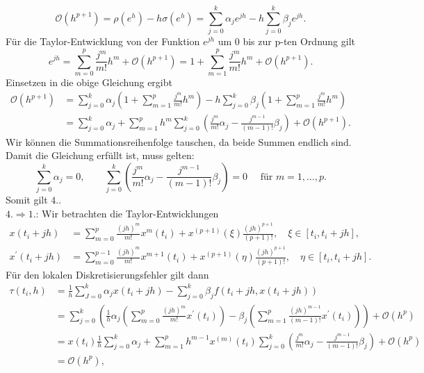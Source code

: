 \[
    \mathcal{O}(h^{p+1}) = \rho(e^h) - h \sigma(e^h) = \sum_{j=0}^{k} \alpha_j e^{jh} - h \sum_{j=0}^{k} \beta_j e^{jh}.
\]
Für die Taylor-Entwicklung von der Funktion $e^{jh}$ um $0$ bis zur p-ten Ordnung gilt
\[
    e^{jh} = \sum_{m=0}^{p} \frac{j^m}{m!}h^m + \mathcal{O}(h^{p+1})
    = 1 + \sum_{m=1}^{p} \frac{j^m}{m!}h^m + \mathcal{O}(h^{p+1}).
\]
Einsetzen in die obige Gleichung ergibt
\begin{align*}
    \mathcal{O}(h^{p+1})
    &= \sum_{j=0}^{k} \alpha_j  \left( 1 + \sum_{m=1}^{p} \frac{j^m}{m!}h^m \right)
    - h \sum_{j=0}^{k} \beta_j  \left( 1 + \sum_{m=1}^{p} \frac{j^m}{m!}h^m \right) \\
    &= \sum_{j=0}^{k}\alpha_j + \sum_{m=1}^{p} h^{m} \sum_{j=0}^{k}
    \left( \frac{j^m}{m!} \alpha_j - \frac{j^{m-1}}{(m-1)!}\beta_j \right) + \mathcal{O}(h^{p+1}).
\end{align*}
Wir können die Summationsreihenfolge tauschen, da beide Summen endlich sind. Damit die Gleichung erfüllt ist, muss
gelten:
\[
    \sum_{j=0}^{k} \alpha_j = 0, \qquad
    \sum_{j=0}^{k} \left( \frac{j^m}{m!}\alpha_j - \frac{j^{m-1}}{(m-1)!}\beta_j \right) = 0 \quad
    \text{ für } m = 1, \dots, p.
\]
Somit gilt $4.$.\\
$4. \Rightarrow 1.$: Wir betrachten die Taylor-Entwicklungen
\begin{align*}
    x(t_i + jh) &= \sum_{m=0}^{p} \frac{(jh)^m}{m!}x^{m}(t_i) + x^{(p+1)}(\xi)\frac{(jh)^{p+1}}{(p+1)!}, \quad
    \xi \in [t_i, t_i + jh], \\
    x^{\prime}(t_i + jh) &= \sum_{m=0}^{p-1} \frac{(jh)^m}{m!}x^{m+1}(t_i) + x^{(p+1)}(\eta)\frac{(jh)^{p+1}}{(p+1)!},
    \quad \eta \in [t_i, t_i + jh].
\end{align*}
Für den lokalen Diskretisierungsfehler gilt dann
\begin{align*}
    \tau(t_i,h) &= \frac{1}{h} \sum_{J=0}^{k} \alpha_j x(t_i + jh) - \sum_{j=0}^{k} \beta_j f(t_i+jh,x(t_i+jh))\\
    &= \sum_{j=0}^{k}\left( \frac{1}{h}\alpha_j \left( \sum_{m=0}^{p} \frac{(jh)^m}{m!}x^{\prime}(t_i)  \right)
    - \beta_j \left( \sum_{m=1}^{p} \frac{(jh)^{m-1}}{(m-1)!}x^{\prime}(t_i) \right) \right) + \mathcal{O}(h^p) \\
    &= x(t_i) \frac{1}{h} \sum_{j=0}^{k} \alpha_j + \sum_{m=1}^{p} h^{m-1} x^{(m
    )}(t_i)
    \sum_{j=0}^{k}\left( \frac{j^m}{m!} \alpha_j - \frac{j^{m-1}}{(m-1)!} \beta_j \right) + \mathcal{O}(h^p)\\
    &= \mathcal{O}(h^p),
\end{align*}
